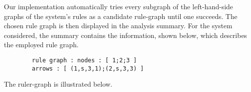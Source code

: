 Our implementation automatically tries every subgraph of the left-hand-side graphs of the system's rules as a candidate rule-graph until one succeeds. The chosen rule graph is then displayed in the analysis summary. For the system considered, the summary contains the information, shown below, which describes the employed rule graph.
\begin{center}
    \begin{verbatim}
        rule graph : nodes : [ 1;2;3 ]
        arrows : [ (1,s,3,1);(2,s,3,3) ]
    \end{verbatim}
\end{center}
The ruler-graph is illustrated below.
\begin{center}
    \end{center}

